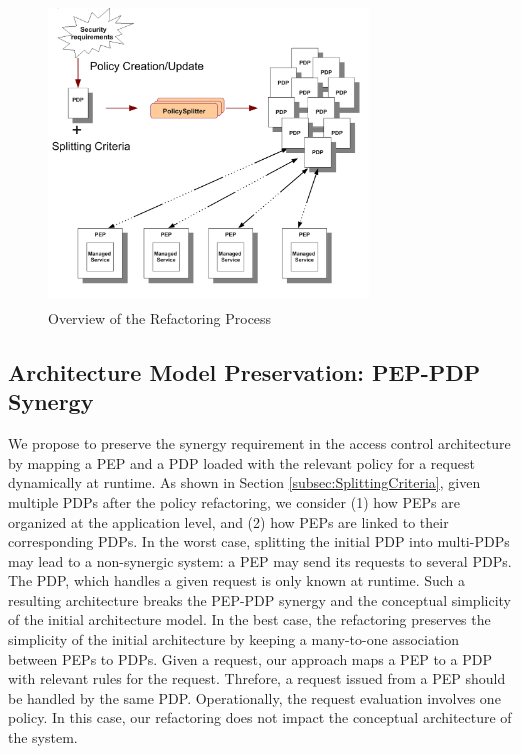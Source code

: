 

\begin{figure}[!h]
\begin{center}
\includegraphics[width=8.5cm, height=8cm]{Overall-process}
\caption{Overview of the Refactoring Process}
\label{overallprocess}
\end{center}
\end{figure}


\subsection{Architecture Model Preservation: PEP-PDP Synergy}

We propose to preserve the synergy requirement in the access control architecture by mapping a PEP and a PDP loaded
with the relevant policy for a request dynamically at runtime.
As shown in Section \ref{subsec:SplittingCriteria}, given multiple PDPs after the policy refactoring, we consider 
(1) how PEPs are organized at the application level, and (2) how PEPs are linked to their corresponding PDPs.
In the worst case, splitting the initial PDP into multi-PDPs may lead to a non-synergic system: a PEP may send its requests to several PDPs. 
The PDP, which handles a given request is only known at runtime. Such a resulting architecture breaks the PEP-PDP synergy and the conceptual 
simplicity of the initial architecture model. 
In the best case, the refactoring preserves the simplicity of the initial architecture by keeping a many-to-one association 
between PEPs to PDPs. Given a request, our approach maps a PEP to a PDP with relevant rules for the request.
Threfore, a request issued from a PEP should be handled by the same PDP. Operationally, the request evaluation involves 
one policy. In this case, our refactoring does not impact the conceptual architecture of the system.


